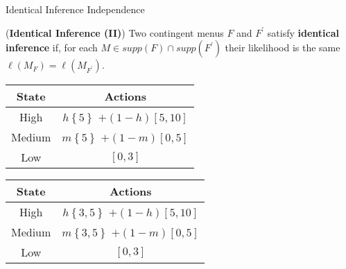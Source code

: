 \documentclass[usenames,dvipsnames,aspectratio=169,11pt, envcountsect, handout]{beamer}
\begin{document}
\begin{frame}{Identical Inference Independence}

	\begin{df}\label{def:ii}
		(\textbf{Identical Inference (II)})
		Two contingent menus \(F\) and \(F^{\prime}\) satisfy \textbf{identical inference} if, for each \(M \in supp \left(F \right) \cap supp \left( F^{\prime} \right)\) their likelihood is the same \(\ell \left( M_F \right) = \ell\left( M_{F^{\prime}} \right)\).
	\end{df}

	\vfill

	\begin{table}[H]
		\centering
		\begin{minipage}{0.45\textwidth}
			\centering
			\begin{tabular}{c | c}
				State                          & Actions                                                                                       \\
				\hline
				{\color{bleudefrance} High}    & {\color{bleudefrance}\( h \left\{ 5 \right\} \) } \(+ \left(1-h \right) \left[5,10 \right] \) \\
				{\color{bleudefrance} Medium } & {\color{bleudefrance}\( m \left\{ 5 \right\} \) } \(+ \left(1-m \right) \left[0,5 \right] \)  \\
				Low                            & \( \left[0,3 \right] \)                                                                       \\
			\end{tabular}
			\vspace{0.5cm} %
		\end{minipage}\hspace{0.5cm} %
		\hspace{0.25cm}
		\begin{minipage}{0.45\textwidth}
			\centering
			\begin{tabular}{c | c}
				State                          & Actions                                                                                         \\
				\hline
				{\color{bleudefrance} High}    & {\color{bleudefrance}\( h \left\{ 3,5 \right\} \) } \(+ \left(1-h \right) \left[5,10 \right] \) \\
				{\color{bleudefrance} Medium } & {\color{bleudefrance}\( m \left\{ 3,5 \right\} \) } \(+ \left(1-m \right) \left[0,5 \right] \)  \\
				Low                            & \( \left[0,3 \right] \)                                                                         \\
			\end{tabular}
			\vspace{0.5cm} %
		\end{minipage}
	\end{table} \pause


\end{frame}
\end{document}

